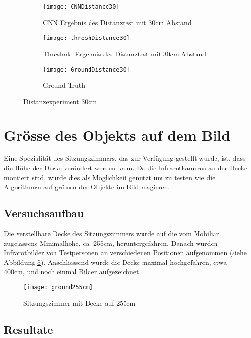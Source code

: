 \begin{figure}[H]
	\begin{subfigure}{.45\linewidth}
		\centering
		\texttt{[image: CNNDistance30]}
		\caption{\gls{CNN} Ergebnis des Distanztest mit 30cm Abstand}
		\label{fig:cnnDistance30}
	\end{subfigure}\hfill%
	\begin{subfigure}{.45\linewidth}
		\centering
		\texttt{[image: threshDistance30]}
		\caption{Threshold Ergebnis des Distanztest mit 30cm Abstand}
		\label{fig:thresholdDistance30}
	\end{subfigure}\hfill%
	\begin{subfigure}{\linewidth}
		\centering
		\texttt{[image: GroundDistance30]}
		\caption{Ground-Truth}
		\label{fig:groundDistance30}
	\end{subfigure}
	\caption{Distanzexperiment 30cm}
	\label{fig:Distance30}
\end{figure}

\section{Grösse des Objekts auf dem Bild}
\label{sec:objectSize}
Eine Spezialität des Sitzungszimmers, das zur Verfügung gestellt wurde, ist, dass die Höhe der Decke verändert werden kann. Da die Infrarotkameras an der Decke montiert sind, wurde dies als Möglichkeit genutzt um zu testen wie die Algorithmen auf grössen der Objekte im Bild reagieren. 

\subsection{Versuchsaufbau}

Die verstellbare Decke des Sitzungszimmers wurde auf die vom Mobiliar zugelassene Minimalhöhe, ca. 255cm, heruntergefahren. Danach wurden Infrarotbilder von Testpersonen an verschiedenen Positionen aufgenommen (siehe Abbildung \ref{fig:ground255cm}). Anschliessend wurde die Decke maximal hochgefahren, etwa 400cm, und noch einmal Bilder aufgezeichnet.

\begin{figure}[H]
	\centering
	\texttt{[image: ground255cm]}
	\caption{Sitzungszimmer mit Decke auf 255cm}
	\label{fig:ground255cm}
\end{figure}

\subsection{Resultate}


